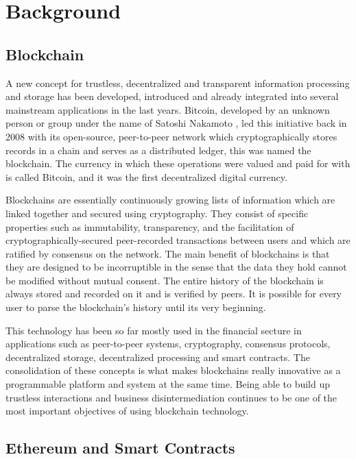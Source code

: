 \chapter{Background}

\section{Blockchain}

A new concept for trustless, decentralized and transparent information processing and storage has been developed, introduced and already integrated into several mainstream applications in the last years. Bitcoin, developed by an unknown person or group under the name of Satoshi Nakamoto \cite{nakamoto2008bitcoin}, led this initiative back in 2008 with its open-source, peer-to-peer network which cryptographically stores records in a chain and serves as a distributed ledger, this was named the blockchain. The currency in which these operations were valued and paid for with is called Bitcoin, and it was the first decentralized digital currency.

Blockchains are essentially continuously growing lists of information which are linked together and secured using cryptography. They consist of specific properties such as immutability, transparency, and the facilitation of cryptographically-secured peer-recorded transactions between users and  which are ratified by consensus on the network.
The main benefit of blockchains is that they are designed to be incorruptible in the sense that the data they hold cannot be modified without mutual consent. The entire history of the blockchain is always stored and recorded on it and is verified by peers. It is possible for every user to parse the blockchain's history until its very beginning.

This technology has been so far mostly used in the financial secture in applications such as peer-to-peer systems, cryptography, consensus protocols, decentralized storage, decentralized processing and smart contracts. The consolidation of these concepts is what makes blockchains really innovative as a programmable platform and system at the same time.
Being able to build up trustless interactions and business disintermediation continues to be one of the most important objectives of using blockchain technology.

\section{Ethereum and Smart Contracts}

